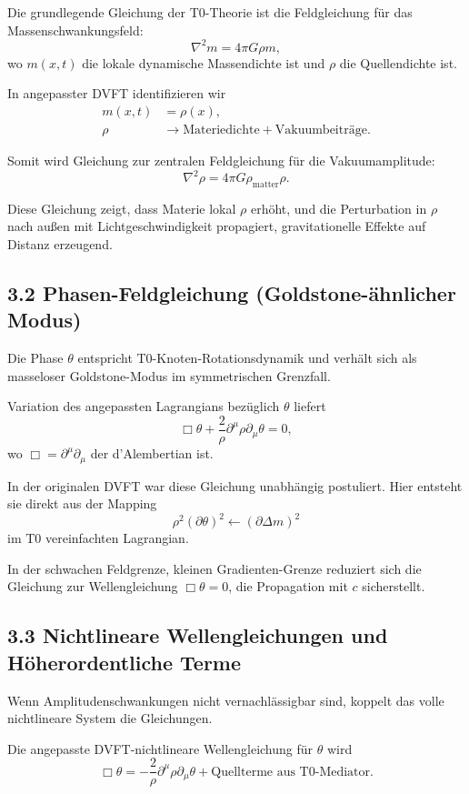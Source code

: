 \documentclass[12pt,a4paper]{article}
\begin{document}
	Die grundlegende Gleichung der T0-Theorie ist die Feldgleichung für das Massenschwankungsfeld:
	\[
	\nabla^2 m = 4\pi G \rho m,
	\]
	wo $m(x,t)$ die lokale dynamische Massendichte ist und $\rho$ die Quellendichte ist.
	
	In angepasster DVFT identifizieren wir
	\begin{align}
		m(x,t) &= \rho(x), \\
		\rho &\to \text{Materiedichte} + \text{Vakuumbeiträge}.
	\end{align}
	
	Somit wird Gleichung zur zentralen Feldgleichung für die Vakuumamplitude:
	\[
	\nabla^2 \rho = 4\pi G \rho_{\text{matter}} \rho.
	\]
	
	Diese Gleichung zeigt, dass Materie lokal $\rho$ erhöht, und die Perturbation in $\rho$ nach außen mit Lichtgeschwindigkeit propagiert, gravitationelle Effekte auf Distanz erzeugend.
	
	\subsection{3.2 Phasen-Feldgleichung (Goldstone-ähnlicher Modus)}
	
	Die Phase $\theta$ entspricht T0-Knoten-Rotationsdynamik und verhält sich als masseloser Goldstone-Modus im symmetrischen Grenzfall.
	
	Variation des angepassten Lagrangians bezüglich $\theta$ liefert
	\[
	\Box \theta + \frac{2}{\rho} \partial^\mu \rho \partial_\mu \theta = 0,
	\]
	wo $\Box = \partial^\mu \partial_\mu$ der d'Alembertian ist.
	
	In der originalen DVFT war diese Gleichung unabhängig postuliert. Hier entsteht sie direkt aus der Mapping
	\[
	\rho^2 (\partial \theta)^2 \leftarrow (\partial \Delta m)^2
	\]
	im T0 vereinfachten Lagrangian.
	
	In der schwachen Feldgrenze, kleinen Gradienten-Grenze reduziert sich die Gleichung zur Wellengleichung $\Box \theta = 0$, die Propagation mit $c$ sicherstellt.
	
	\subsection{3.3 Nichtlineare Wellengleichungen und Höherordentliche Terme}
	
	Wenn Amplitudenschwankungen nicht vernachlässigbar sind, koppelt das volle nichtlineare System die Gleichungen.
	
	Die angepasste DVFT-nichtlineare Wellengleichung für $\theta$ wird
	\[
	\Box \theta = -\frac{2}{\rho} \partial^\mu \rho \partial_\mu \theta + \text{Quellterme aus T0-Mediator}.
	\]
	
\end{document}
